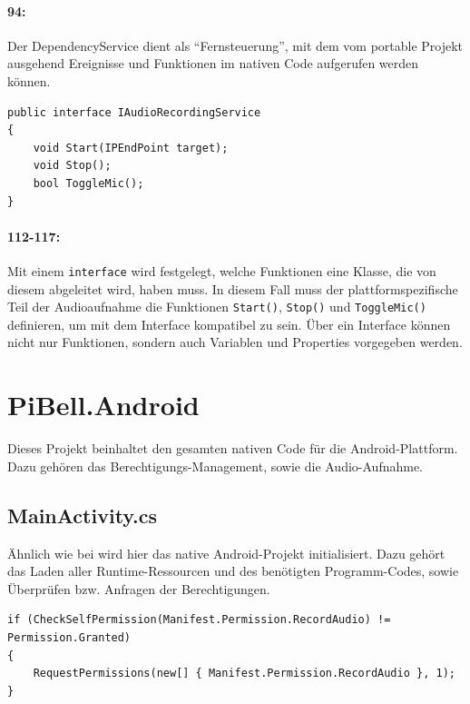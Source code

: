 \paragraph{94:} Der DependencyService dient als \enquote{Fernsteuerung}, mit dem vom portable Projekt ausgehend Ereignisse und Funktionen im nativen Code aufgerufen werden können.

\begin{verbatim}
public interface IAudioRecordingService
{
    void Start(IPEndPoint target);
    void Stop();
    bool ToggleMic();
}
\end{verbatim}
\paragraph{112-117:} Mit einem \texttt{interface} wird festgelegt, welche Funktionen eine Klasse, die von diesem abgeleitet wird, haben muss.
In diesem Fall muss der plattformspezifische Teil der Audioaufnahme die Funktionen \texttt{Start()}, \texttt{Stop()} und \texttt{ToggleMic()} definieren, um mit dem Interface kompatibel zu sein.
Über ein Interface können nicht nur Funktionen, sondern auch Variablen und Properties vorgegeben werden.


\section{PiBell.Android}
Dieses Projekt beinhaltet den gesamten nativen Code für die Android-Plattform.
Dazu gehören das Berechtigungs-Management, sowie die Audio-Aufnahme.

\subsection{MainActivity.cs}
Ähnlich wie bei  wird hier das native Android-Projekt initialisiert.
Dazu gehört das Laden aller Runtime-Ressourcen und des benötigten Programm-Codes, sowie Überprüfen bzw. Anfragen der Berechtigungen.
\begin{verbatim}
if (CheckSelfPermission(Manifest.Permission.RecordAudio) != Permission.Granted)
{
    RequestPermissions(new[] { Manifest.Permission.RecordAudio }, 1);
}
\end{verbatim}
